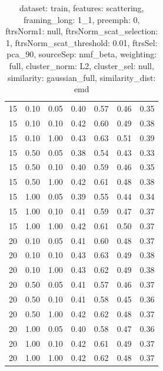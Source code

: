 \documentclass[12pt,a4paper,fleqn]{tufte-handout}
\begin{document}
\begin{table}
\begin{center}
\begin{tabular}{lllcccc}
15 & 0.10 & 0.05 & 0.40 & 0.57 & 0.46 & 0.35 \\                        
15 & 0.10 & 0.10 & 0.42 & 0.60 & 0.49 & 0.38 \\                        
15 & 0.10 & 1.00 & 0.43 & 0.63 & 0.51 & 0.39 \\                        
15 & 0.50 & 0.05 & 0.38 & 0.54 & 0.43 & 0.33 \\                        
15 & 0.50 & 0.10 & 0.40 & 0.59 & 0.46 & 0.35 \\                        
15 & 0.50 & 1.00 & 0.42 & 0.61 & 0.48 & 0.38 \\                        
15 & 1.00 & 0.05 & 0.39 & 0.55 & 0.44 & 0.34 \\                        
15 & 1.00 & 0.10 & 0.41 & 0.59 & 0.47 & 0.37 \\                        
15 & 1.00 & 1.00 & 0.42 & 0.61 & 0.50 & 0.37 \\                        
20 & 0.10 & 0.05 & 0.41 & 0.60 & 0.48 & 0.37 \\                        
20 & 0.10 & 0.10 & 0.43 & 0.63 & 0.49 & 0.38 \\                        
20 & 0.10 & 1.00 & 0.43 & 0.62 & 0.49 & 0.38 \\                        
20 & 0.50 & 0.05 & 0.41 & 0.57 & 0.46 & 0.37 \\                        
20 & 0.50 & 0.10 & 0.41 & 0.58 & 0.45 & 0.36 \\                        
20 & 0.50 & 1.00 & 0.42 & 0.62 & 0.48 & 0.37 \\                        
20 & 1.00 & 0.05 & 0.40 & 0.58 & 0.47 & 0.36 \\                        
20 & 1.00 & 0.10 & 0.42 & 0.61 & 0.49 & 0.37 \\                        
20 & 1.00 & 1.00 & 0.42 & 0.62 & 0.48 & 0.37 \\                        
\end{tabular}                        
\end{center}                        
\caption{dataset: train, features: scattering, framing\_long: 1\_1, preemph: 0, ftrsNorm1: null, ftrsNorm\_scat\_selection: 1, ftrsNorm\_scat\_threshold: 0.01, ftrsSel: pca\_90, sourceSep: nmf\_beta, weighting: full, cluster\_norm: L2, cluster\_sel: null, similarity: gaussian\_full, similarity\_dist: emd}                        
\label{datasetrFeaturscFraminlong1_1Preemp0Ftrsnorm1nuFtrsnoscatselect1Ftrsnoscatthresh0.01Ftrsselpc90SourcesepnmbeWeightfuClustenormL2ClusteselnuSimilagafuSimiladistem}                        
\end{table}                        
 
\end{document}
